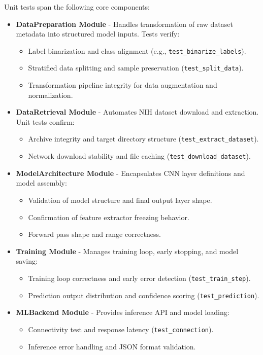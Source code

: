 \documentclass[12pt, titlepage]{article}
\begin{document}
Unit tests span the following core components:
\begin{itemize}
  \item \textbf{DataPreparation Module} - Handles transformation of raw dataset metadata into structured model inputs. Tests verify:
    \begin{itemize}
      \item Label binarization and class alignment (e.g., \texttt{test\_binarize\_labels}).
      \item Stratified data splitting and sample preservation (\texttt{test\_split\_data}).
      \item Transformation pipeline integrity for data augmentation and normalization.
    \end{itemize}

  \item \textbf{DataRetrieval Module} - Automates NIH dataset download and extraction. Unit tests confirm:
    \begin{itemize}
      \item Archive integrity and target directory structure (\texttt{test\_extract\_dataset}).
      \item Network download stability and file caching (\texttt{test\_download\_dataset}).
    \end{itemize}

  \item \textbf{ModelArchitecture Module} - Encapsulates CNN layer definitions and model assembly:
    \begin{itemize}
      \item Validation of model structure and final output layer shape.
      \item Confirmation of feature extractor freezing behavior.
      \item Forward pass shape and range correctness.
    \end{itemize}

  \item \textbf{Training Module} - Manages training loop, early stopping, and model saving:
    \begin{itemize}
      \item Training loop correctness and early error detection (\texttt{test\_train\_step}).
      \item Prediction output distribution and confidence scoring (\texttt{test\_prediction}).
    \end{itemize}

  \item \textbf{MLBackend Module} - Provides inference API and model loading:
    \begin{itemize}
      \item Connectivity test and response latency (\texttt{test\_connection}).
      \item Inference error handling and JSON format validation.
    \end{itemize}


\end{itemize}
\end{document}
